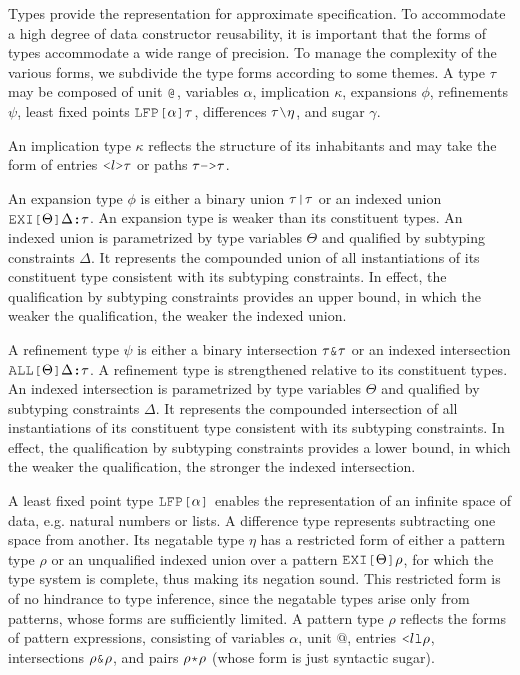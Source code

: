 \documentclass[acmsmall]{acmart}
\theoremstyle{definition}
\begin{document}

\noindent
Types provide the representation for approximate specification.
To accommodate a high degree of data constructor reusability,
it is important that the forms of types accommodate a wide range of precision.
To manage the complexity of the various forms, we subdivide the type forms
according to some themes.
A type $\tau$ may be composed of unit $\J{@}$, variables $\alpha$, 
implication $\kappa$, expansions $\phi$, refinements $\psi$,
least fixed points $\J{LFP[}\alpha \J{]} \tau$,
differences $\tau \typdiff \eta$, and sugar $\gamma$.

An implication type $\kappa$ reflects the structure of 
its inhabitants and may take the form of  
entries $\J{<}l\J{>}\tau$ or paths $\tau \J{->} \tau$.

An expansion type $\phi$ is either a binary union $\tau \J{|} \tau$ or 
an indexed union $\J{EXI[}\Theta \J{]} \Delta \J{:} \tau$.
An expansion type is weaker than its constituent types. 
An indexed union is parametrized by type variables $\Theta$ 
and qualified by subtyping constraints $\Delta$.
It represents the compounded union of all instantiations of its constituent type 
consistent with its subtyping constraints.
In effect, the qualification by subtyping constraints provides an upper bound, in which
the weaker the qualification, the weaker the indexed union.

A refinement type $\psi$ is either a binary intersection $\tau \J{\&} \tau$ or 
an indexed intersection $\J{ALL[} \Theta \J{]} \Delta \J{:}\tau$.
A refinement type is strengthened relative to its constituent types. 
An indexed intersection is parametrized by type variables $\Theta$ 
and qualified by subtyping constraints $\Delta$.
It represents the compounded intersection of all instantiations of its constituent type 
consistent with its subtyping constraints.
In effect, the qualification by subtyping constraints provides a lower bound, in which
the weaker the qualification, the stronger the indexed intersection.

A least fixed point type $\J{LFP[}\alpha \J{]}$ 
enables the representation of an infinite space of data,
e.g. natural numbers or lists. 
A difference type represents subtracting one space from another.
Its negatable type $\eta$ has a restricted form of either
a pattern type $\rho$ or an unqualified indexed union 
over a pattern $\J{EXI[}\Theta \J{]} \rho$, for which the type system
is complete, thus making its negation sound.  
This restricted form is of no hindrance to type inference, since the 
negatable types arise only from patterns, whose forms are sufficiently
limited.
A pattern type $\rho$ reflects the forms of pattern expressions, consisting of 
variables $\alpha$, unit $@$, entries $\J{<} l \J{l} \rho$, intersections $\rho \J{\&} \rho$,
and pairs $\rho \J{*} \rho$ (whose form is just syntactic sugar).
\end{document}
